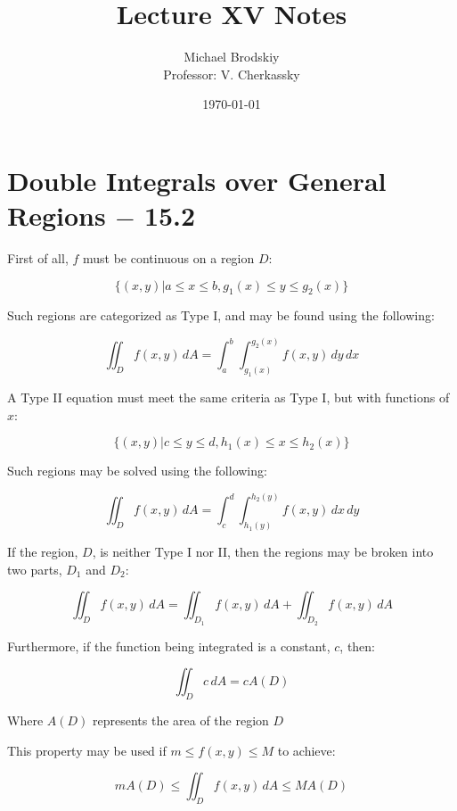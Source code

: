 \documentclass[12pt]{article}
\title{Lecture XV Notes}
\date{\today}
\author{Michael Brodskiy\\ \small Professor: V. Cherkassky}
\begin{document}
\maketitle

\section{Double Integrals over General Regions $-$ 15.2}

First of all, $f$ must be continuous on a region $D$:

$$\{(x,y)|a\leq x\leq b, g_1(x)\leq y\leq g_2(x)\}$$

Such regions are categorized as Type I, and may be found using the following:

$$\iint_D f(x,y)\,dA=\int_a^b\int_{g_1(x)}^{g_2(x)} f(x,y)\,dy\,dx$$

A Type II equation must meet the same criteria as Type I, but with functions of $x$:

$$\{(x,y)|c\leq y\leq d, h_1(x)\leq x\leq h_2(x)\}$$

Such regions may be solved using the following:

$$\iint_D f(x,y)\,dA=\int_c^d\int_{h_1(y)}^{h_2(y)} f(x,y)\,dx\,dy$$

If the region, $D$, is neither Type I nor II, then the regions may be broken into two parts, $D_1$ and $D_2$:

$$\iint_D f(x,y)\,dA=\iint_{D_1} f(x,y)\,dA+\iint_{D_2} f(x,y)\,dA$$

Furthermore, if the function being integrated is a constant, $c$, then:

$$\iint_D c\,dA=cA(D)$$

Where $A(D)$ represents the area of the region $D$

This property may be used if $m\leq f(x,y)\leq M$ to achieve:

$$mA(D) \leq \iint_D f(x,y)\,dA \leq MA(D)$$
\end{document}
